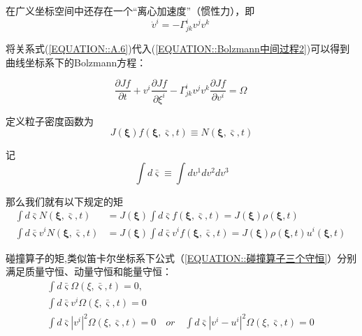 \documentclass[MathematicsNumericsDerivationsAndOpenFOAM.tex]{subfiles}
\begin{document}
在广义坐标空间中还存在一个“离心加速度”（惯性力），即
%
%
\begin{equation}
  \dot{v}^{i}=- \Gamma_{j k}^{i}v^{j} v^{k}
  \label{EQUATION::A.6} ~
\end{equation}
%

将关系式(\ref{EQUATION::A.6})代入(\ref{EQUATION::Bolzmann中间过程2})可以得到曲线坐标系下的Bolzmann方程：

\begin{equation}
  \boxed{
  \frac{\partial Jf}{\partial t}+v^{i} \frac{\partial Jf}{\partial \xi^{i}}  - \Gamma_{j k}^{i} v^{j} v^{k}  \frac{\partial Jf}{\partial  v^{i}}  =\Omega
  }
  \label{EQUATION::Bolzamman 曲线} ~
\end{equation}







定义粒子密度函数为
\begin{equation}
  J(\boldsymbol{\xi}) f(\boldsymbol{\xi}, \bar{\varsigma}, t) \equiv N(\boldsymbol{\xi}, \bar{\varsigma}, t)
\end{equation}

记
\begin{equation}
  \int d \bar{\varsigma} \equiv \int d v^{1} d v^{2} d v^{3}
\end{equation}



那么我们就有以下规定的矩
%
%
\begin{equation}
  \begin{aligned}
    \int d \bar{\varsigma} N(\boldsymbol{\xi}, \bar{\varsigma}, t)       & =J(\boldsymbol{\xi}) \int d \bar{\varsigma} f(\boldsymbol{\xi}, \bar{\varsigma}, t)=J(\boldsymbol{\xi}) \rho(\boldsymbol{\xi}, t)                                  \\
    \int d \bar{\varsigma} v^{i} N(\boldsymbol{\xi}, \bar{\varsigma}, t) & =J(\boldsymbol{\xi}) \int d \bar{\varsigma} v^{i} f(\boldsymbol{\xi}, \bar{\varsigma}, t)=J(\boldsymbol{\xi}) \rho(\boldsymbol{\xi}, t) u^{i}(\boldsymbol{\xi}, t)
  \end{aligned}
  \label{EQUATION::A.11} ~
\end{equation}
%
%

碰撞算子的矩,类似笛卡尔坐标系下公式（\ref{EQUATION::碰撞算子三个守恒}）分别满足质量守恒、动量守恒和能量守恒：
\begin{equation}
  \begin{aligned}
    \int d \bar{\varsigma} \Omega(\xi, \bar{\varsigma}, t)=0,      \\
    \int d \bar{\varsigma} v^{i} \Omega(\xi, \bar{\varsigma}, t)=0 \\
    \int d \bar{\varsigma} |v^i|^2 \Omega(\xi, \bar{\varsigma}, t)=0 \quad or \quad \int d \bar{\varsigma} |v^i-u^i|^2 \Omega(\xi, \bar{\varsigma}, t)=0
  \end{aligned}
  \label{EQUATION::碰撞特性} ~
\end{equation}
%
\end{document}
